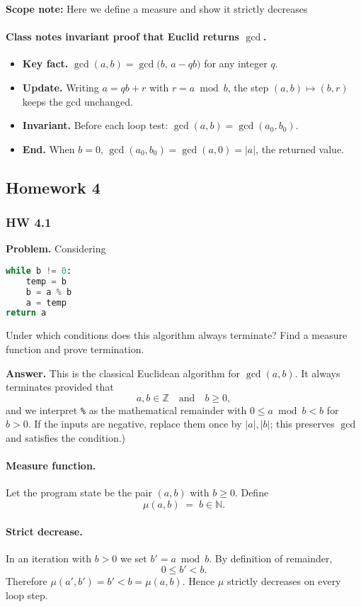 \documentclass{article}
\theoremstyle{theorem}
\theoremstyle{definition}
\theoremstyle{remark}
\begin{document}
\textbf{Scope note:} Here we define a measure and show it strictly decreases

\paragraph{Class notes invariant proof that Euclid returns $\gcd$.}
\begin{itemize}
  \item \textbf{Key fact.} $\gcd(a,b)=\gcd\!\big(b,\,a-qb\big)$ for any integer $q$.
  \item \textbf{Update.} Writing $a=qb+r$ with $r=a\bmod b$, the step $(a,b)\mapsto(b,r)$ keeps the gcd unchanged.
  \item \textbf{Invariant.} Before each loop test: $\gcd(a,b)=\gcd(a_0,b_0)$.
  \item \textbf{End.} When $b=0$, $\gcd(a_0,b_0)=\gcd(a,0)=|a|$, the returned value.
\end{itemize}

\subsection{Homework 4}

\subsubsection*{HW 4.1}
\textbf{Problem.} Considering
\begin{lstlisting}[language=Python]
while b != 0:
    temp = b
    b = a % b
    a = temp
return a
\end{lstlisting}
Under which conditions does this algorithm always terminate? Find a measure function and prove termination.

\medskip
\textbf{Answer.}  
This is the classical Euclidean algorithm for $\gcd(a,b)$. It always terminates provided that
\[
a,b \in \mathbb{Z}\quad\text{and}\quad b \ge 0,
\]
and we interpret \texttt{\%} as the mathematical remainder with $0 \le a \bmod b < b$ for $b>0$. If the inputs are negative, replace them once by $|a|,|b|$; this preserves $\gcd$ and satisfies the condition.)

\paragraph{Measure function.}
Let the program state be the pair $(a,b)$ with $b \ge 0$. Define
\[
\mu(a,b) \;=\; b \in \mathbb{N}.
\]

\paragraph{Strict decrease.}
In an iteration with $b>0$ we set $b' = a \bmod b$. By definition of remainder,
\[
0 \le b' < b.
\]
Therefore $\mu(a',b') = b' < b = \mu(a,b)$. Hence $\mu$ strictly decreases on every loop step.
\end{document}
